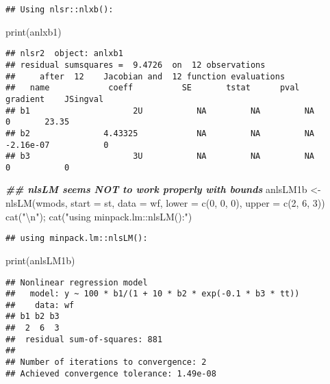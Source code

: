 \documentclass[
]{article}
\newenvironment{Shaded}{\begin{snugshade}}{\end{snugshade}}
\newcommand{\AttributeTok}[1]{\textcolor[rgb]{0.77,0.63,0.00}{#1}}
\newcommand{\DecValTok}[1]{\textcolor[rgb]{0.00,0.00,0.81}{#1}}
\newcommand{\DocumentationTok}[1]{\textcolor[rgb]{0.56,0.35,0.01}{\textbf{\textit{#1}}}}
\newcommand{\FunctionTok}[1]{\textcolor[rgb]{0.00,0.00,0.00}{#1}}
\newcommand{\NormalTok}[1]{#1}
\newcommand{\OtherTok}[1]{\textcolor[rgb]{0.56,0.35,0.01}{#1}}
\newcommand{\SpecialCharTok}[1]{\textcolor[rgb]{0.00,0.00,0.00}{#1}}
\newcommand{\StringTok}[1]{\textcolor[rgb]{0.31,0.60,0.02}{#1}}
\begin{document}
\begin{verbatim}
## Using nlsr::nlxb():
\end{verbatim}

\begin{Shaded}
\begin{Highlighting}[]
\FunctionTok{print}\NormalTok{(anlxb1)}
\end{Highlighting}
\end{Shaded}

\begin{verbatim}
## nlsr2  object: anlxb1 
## residual sumsquares =  9.4726  on  12 observations
##     after  12    Jacobian and  12 function evaluations
##   name            coeff          SE       tstat      pval      gradient    JSingval   
## b1                     2U           NA         NA         NA           0       23.35  
## b2               4.43325            NA         NA         NA   -2.16e-07           0  
## b3                     3U           NA         NA         NA           0           0
\end{verbatim}

\begin{Shaded}
\begin{Highlighting}[]
\DocumentationTok{\#\# nlsLM seems NOT to work properly with bounds}
\NormalTok{anlsLM1b }\OtherTok{\textless{}{-}} \FunctionTok{nlsLM}\NormalTok{(wmods, }\AttributeTok{start =}\NormalTok{ st, }\AttributeTok{data =}\NormalTok{ wf, }\AttributeTok{lower =} \FunctionTok{c}\NormalTok{(}\DecValTok{0}\NormalTok{, }\DecValTok{0}\NormalTok{, }\DecValTok{0}\NormalTok{), }\AttributeTok{upper =} \FunctionTok{c}\NormalTok{(}\DecValTok{2}\NormalTok{, }\DecValTok{6}\NormalTok{, }\DecValTok{3}\NormalTok{))}
\FunctionTok{cat}\NormalTok{(}\StringTok{"}\SpecialCharTok{\textbackslash{}n}\StringTok{"}\NormalTok{); }\FunctionTok{cat}\NormalTok{(}\StringTok{"using minpack.lm::nlsLM():"}\NormalTok{)}
\end{Highlighting}
\end{Shaded}

\begin{verbatim}
## using minpack.lm::nlsLM():
\end{verbatim}

\begin{Shaded}
\begin{Highlighting}[]
\FunctionTok{print}\NormalTok{(anlsLM1b)}
\end{Highlighting}
\end{Shaded}

\begin{verbatim}
## Nonlinear regression model
##   model: y ~ 100 * b1/(1 + 10 * b2 * exp(-0.1 * b3 * tt))
##    data: wf
## b1 b2 b3 
##  2  6  3 
##  residual sum-of-squares: 881
## 
## Number of iterations to convergence: 2 
## Achieved convergence tolerance: 1.49e-08
\end{verbatim}
\end{document}
